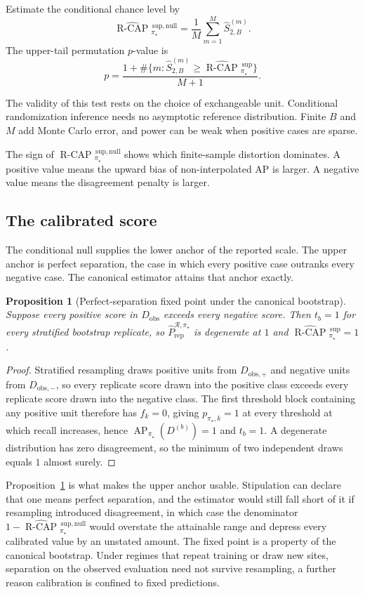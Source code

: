 \documentclass[11pt]{article}
\newcommand{\AP}{\operatorname{AP}}
\newcommand{\Regime}{\mathcal{R}}
\newcommand{\RCAPHat}{\widehat{\operatorname{R\text{-}CAP}}{}^{\,\mathrm{sup}}_{\pi_\star}}
\newcommand{\RCAPnullHat}{\widehat{\operatorname{R\text{-}CAP}}{}^{\,\mathrm{sup,null}}_{\pi_\star}}
\newcommand{\PRepHat}{\widehat{P}_{\mathrm{rep}}^{\Regime,\pi_\star}}
\newtheorem{proposition}{Proposition}
\theoremstyle{remark}
\begin{document}
Estimate the conditional chance level by
\begin{equation}
\RCAPnullHat
=
\frac{1}{M}\sum_{m=1}^{M}\widehat S_{2,B}^{(m)}.
\label{eq:conditional-null}
\end{equation}
The upper-tail permutation $p$-value is
\[
p
=
\frac{1+\#\{m:\widehat S_{2,B}^{(m)}\geq\RCAPHat\}}{M+1}.
\]

The validity of this test rests on the choice of exchangeable unit. Conditional randomization inference needs no asymptotic reference distribution. Finite $B$ and $M$ add Monte Carlo error, and power can be weak when positive cases are sparse.

The sign of $\RCAPnullHat$ shows which finite-sample distortion dominates. A positive value means the upward bias of non-interpolated AP is larger. A negative value means the disagreement penalty is larger.

\subsection{The calibrated score}

The conditional null supplies the lower anchor of the reported scale. The upper anchor is perfect separation, the case in which every positive case outranks every negative case. The canonical estimator attains that anchor exactly.

\begin{proposition}[Perfect-separation fixed point under the canonical bootstrap]
\label{prop:fixed-point}
Suppose every positive score in $D_{\mathrm{obs}}$ exceeds every negative score. Then $t_b=1$ for every stratified bootstrap replicate, so $\PRepHat$ is degenerate at $1$ and $\RCAPHat=1$.
\end{proposition}

\begin{proof}
Stratified resampling draws positive units from $D_{\mathrm{obs},+}$ and negative units from $D_{\mathrm{obs},-}$, so every replicate score drawn into the positive class exceeds every replicate score drawn into the negative class. The first threshold block containing any positive unit therefore has $f_k=0$, giving $p_{\pi_\star,k}=1$ at every threshold at which recall increases, hence $\AP_{\pi_\star}(D^{(b)})=1$ and $t_b=1$. A degenerate distribution has zero disagreement, so the minimum of two independent draws equals $1$ almost surely.
\end{proof}

Proposition~\ref{prop:fixed-point} is what makes the upper anchor usable. Stipulation can declare that one means perfect separation, and the estimator would still fall short of it if resampling introduced disagreement, in which case the denominator $1-\RCAPnullHat$ would overstate the attainable range and depress every calibrated value by an unstated amount. The fixed point is a property of the canonical bootstrap. Under regimes that repeat training or draw new sites, separation on the observed evaluation need not survive resampling, a further reason calibration is confined to fixed predictions.
\end{document}
